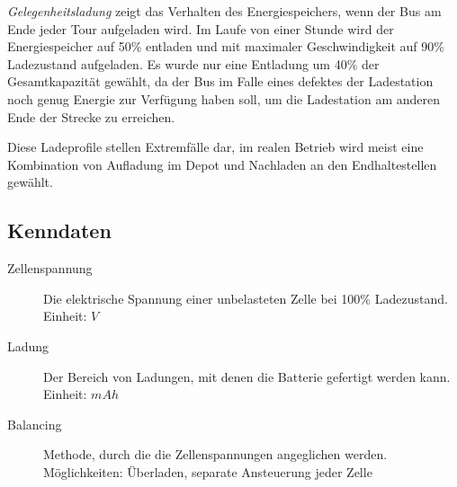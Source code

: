 \emph{Gelegenheitsladung} zeigt das Verhalten des Energiespeichers, wenn der Bus am Ende jeder Tour aufgeladen wird. Im Laufe von einer Stunde wird der Energiespeicher auf 50\% entladen und mit maximaler Geschwindigkeit auf 90\% Ladezustand aufgeladen. Es wurde nur eine Entladung um 40\% der Gesamtkapazität gewählt, da der Bus im Falle eines defektes der Ladestation noch genug Energie zur Verfügung haben soll, um die Ladestation am anderen Ende der Strecke zu erreichen.

Diese Ladeprofile stellen Extremfälle dar, im realen Betrieb wird meist eine Kombination von Aufladung im Depot und Nachladen an den Endhaltestellen gewählt. 

\subsection{Kenndaten}

\begin{description}
	\item[Zellenspannung] Die elektrische Spannung einer unbelasteten Zelle bei 100\% Ladezustand.\\
	Einheit: $V$
	\item[Ladung] Der Bereich von Ladungen, mit denen die Batterie gefertigt werden kann.\\
	Einheit: $mAh$
	\item[Balancing] Methode, durch die die Zellenspannungen angeglichen werden.\\
	Möglichkeiten: Überladen, separate Ansteuerung jeder Zelle
\end{description}

